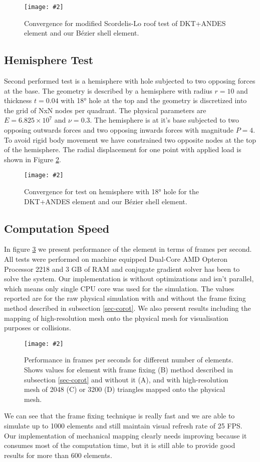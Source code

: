 \documentclass{egpubl}
\newcommand{\Figure}[3]{%
\begin{figure}[htb]
  \centering
  \texttt{[image: \#2]}
  \caption{\label{fig-#2}#3}
\end{figure}}
\begin{document}
\Figure{\linewidth}{roof}
{Convergence for modified Scordelis-Lo roof test of DKT+ANDES element and
our Bézier shell element.}


\subsection{Hemisphere Test}

Second performed test is a hemisphere with hole subjected to two opposing
forces at the base. The geometry is described by a hemisphere with radius
$r=10$ and thickness $t=0.04$ with 18° hole at the top and the geometry is
discretized into the grid of NxN nodes per quadrant. The physical
parameters are $E = 6.825 \times 10^7$ and $\nu = 0.3$. The hemisphere is
at it's base subjected to two opposing outwards forces and two opposing
inwards forces with magnitude $P = 4$. To avoid rigid body movement we have
constrained two opposite nodes at the top of the hemisphere. The radial
displacement for one point with applied load is shown in Figure
\ref{fig-hemisphere}.

\Figure{\linewidth}{hemisphere}
{Convergence for test on hemisphere with 18° hole for the DKT+ANDES element and
our Bézier shell element.}

\subsection{Computation Speed}

In figure \ref{fig-fps} we present performance of the element in terms of
frames per second. All tests were performed on machine equipped Dual-Core
AMD Opteron Processor 2218 and 3 GB of RAM and conjugate gradient solver
has been to solve the system. Our implementation is without optimizations
and isn't parallel, which means only single CPU core was used for the
simulation. The values reported are for the raw physical simulation with
and without the frame fixing method described in subsection
\ref{sec-corot}. We also present results including the mapping of
high-resolution mesh onto the physical mesh for visualisation purposes or
collisions.

\Figure{\linewidth}{fps}
{Performance in frames per seconds for different number of elements. Shows
values for element with frame fixing (B) method described in subsection
\ref{sec-corot} and without it (A), and with high-resolution mesh of 2048
(C) or 3200 (D) triangles mapped onto the physical mesh.}

We can see that the frame fixing technique is really fast and we are able
to simulate up to 1000 elements and still maintain visual refresh rate of
25 FPS. Our implementation of mechanical mapping clearly needs improving
because it consumes most of the computation time, but it is still able to
provide good results for more than 600 elements.
\end{document}
